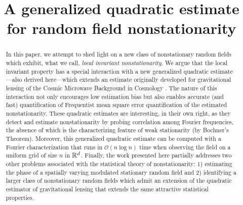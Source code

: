 \documentclass[10pt,noinfoline]{imsart}
\begin{document}
\begin{frontmatter}

\title{A generalized quadratic estimate for random field nonstationarity
}


\begin{abstract}
In this paper, we attempt to shed light on a new class of nonstationary random fields which exhibit, what we call, {\em local invariant nonstationarity}. We argue that the local invariant property has a special interaction with a new  generalized quadratic estimate---also derived here---which extends an estimate originally developed for gravitational lensing of the Cosmic Microwave Background in Cosmology \cite{hu2001mapping, hu2002mass}. The nature of this interaction not only encourages low estimation bias but also enables accurate (and fast) quantification of Frequentist mean square error quantification of the estimated nonstationarity. These quadratic estimates are interesting, in their own right, as they detect and estimate nonstationarity by probing correlation among Fourier frequencies, the absence of which is the characterizing feature of weak stationarity (by Bochner's Theorem). Moreover, this generalized quadratic estimate can be computed with a Fourier characterization that runs in $\mathcal O(n\log n)$ time when observing the field on a uniform grid of size $n$ in $\Bbb R^d $. Finally, the work presented here partially addresses two other problems associated with the statistical theory of nonstationarity: 1) estimating the phase of a spatially varying modulated stationary random field and 2) identifying a larger class of nonstationary random fields which admit an extension of the quadratic estimator of gravitational lensing that extends the same attractive statistical properties.
\end{abstract}
\end{frontmatter}
\end{document}
